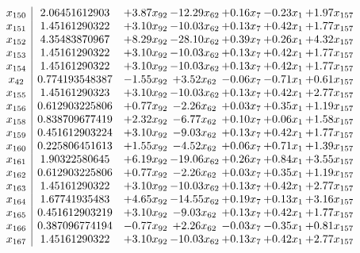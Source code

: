 \documentclass[8pt]{article}
\begin{document}
\[\begin{array}{c| c c@{\hskip 2pt} c@{\hskip 2pt} c@{\hskip 2pt} c@{\hskip 2pt} c@{\hskip 2pt} }
 x_{150}   &  2.06451612903 & +  3.87 x_{92} & -12.29 x_{62} & +  0.16 x_{7} & -0.23 x_{1} & +  1.97 x_{157}\\
 x_{151}   &  1.45161290322 & +  3.10 x_{92} & -10.03 x_{62} & +  0.13 x_{7} & +  0.42 x_{1} & +  1.77 x_{157}\\
 x_{152}   &  4.35483870967 & +  8.29 x_{92} & -28.10 x_{62} & +  0.39 x_{7} & +  0.26 x_{1} & +  4.32 x_{157}\\
 x_{153}   &  1.45161290322 & +  3.10 x_{92} & -10.03 x_{62} & +  0.13 x_{7} & +  0.42 x_{1} & +  1.77 x_{157}\\
 x_{154}   &  1.45161290322 & +  3.10 x_{92} & -10.03 x_{62} & +  0.13 x_{7} & +  0.42 x_{1} & +  1.77 x_{157}\\
 x_{42}   &  0.774193548387 & -1.55 x_{92} & +  3.52 x_{62} & -0.06 x_{7} & -0.71 x_{1} & +  0.61 x_{157}\\
 x_{155}   &  1.45161290323 & +  3.10 x_{92} & -10.03 x_{62} & +  0.13 x_{7} & +  0.42 x_{1} & +  2.77 x_{157}\\
 x_{156}   &  0.612903225806 & +  0.77 x_{92} & -2.26 x_{62} & +  0.03 x_{7} & +  0.35 x_{1} & +  1.19 x_{157}\\
 x_{158}   &  0.838709677419 & +  2.32 x_{92} & -6.77 x_{62} & +  0.10 x_{7} & +  0.06 x_{1} & +  1.58 x_{157}\\
 x_{159}   &  0.451612903224 & +  3.10 x_{92} & -9.03 x_{62} & +  0.13 x_{7} & +  0.42 x_{1} & +  1.77 x_{157}\\
 x_{160}   &  0.225806451613 & +  1.55 x_{92} & -4.52 x_{62} & +  0.06 x_{7} & +  0.71 x_{1} & +  1.39 x_{157}\\
 x_{161}   &  1.90322580645 & +  6.19 x_{92} & -19.06 x_{62} & +  0.26 x_{7} & +  0.84 x_{1} & +  3.55 x_{157}\\
 x_{162}   &  0.612903225806 & +  0.77 x_{92} & -2.26 x_{62} & +  0.03 x_{7} & +  0.35 x_{1} & +  1.19 x_{157}\\
 x_{163}   &  1.45161290322 & +  3.10 x_{92} & -10.03 x_{62} & +  0.13 x_{7} & +  0.42 x_{1} & +  2.77 x_{157}\\
 x_{164}   &  1.67741935483 & +  4.65 x_{92} & -14.55 x_{62} & +  0.19 x_{7} & +  0.13 x_{1} & +  3.16 x_{157}\\
 x_{165}   &  0.451612903219 & +  3.10 x_{92} & -9.03 x_{62} & +  0.13 x_{7} & +  0.42 x_{1} & +  1.77 x_{157}\\
 x_{166}   &  0.387096774194 & -0.77 x_{92} & +  2.26 x_{62} & -0.03 x_{7} & -0.35 x_{1} & +  0.81 x_{157}\\
 x_{167}   &  1.45161290322 & +  3.10 x_{92} & -10.03 x_{62} & +  0.13 x_{7} & +  0.42 x_{1} & +  2.77 x_{157}\\

\end{array}\]
\end{document}
